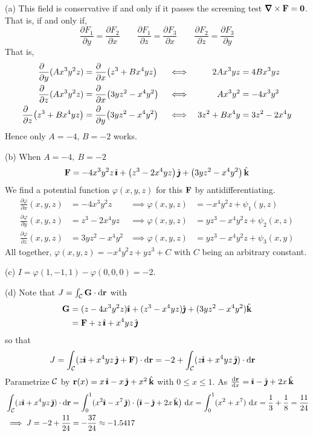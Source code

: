 \begin{solution}  (a)
This field is conservative if and only if it passes the screening test 
$\vnabla\times\vF=\vZero$. That is, if and only if,
$$
\frac{\partial F_1}{\partial y}=\frac{\partial F_2}{\partial x}\qquad
\frac{\partial F_1}{\partial z}=\frac{\partial F_3}{\partial x}\qquad
\frac{\partial F_2}{\partial z}=\frac{\partial F_3}{\partial y}
$$
That is,
\begin{align*}
\frac{\partial\hfill}{\partial y}(Ax^3y^2z)
&=\frac{\partial\hfill}{\partial x}\big(z^3+Bx^4yz\big) &
&\iff &
2Ax^3yz & =4Bx^3yz
\\
%
\frac{\partial\hfill}{\partial z}(Ax^3y^2z)
&=\frac{\partial\hfill}{\partial x}\big(3yz^2-x^4y^2\big) &
&\iff &
Ax^3y^2 & =-4x^3y^2
\\
%
\frac{\partial\hfill}{\partial z}\big(z^3+Bx^4yz\big)
&=\frac{\partial\hfill}{\partial y}\big(3yz^2-x^4y^2\big) &
&\iff &
3z^2+Bx^4y& =3z^2-2x^4y
\end{align*}
Hence only $A=-4$, $B=-2$ works.

(b) When $A=-4,\ B=-2$
$$
\mathbf{F}=-4x^3y^2z\,\hat{\pmb{\imath}}+\big(z^3-2x^4yz\big)\,\hat{\pmb{\jmath}}
+\big(3yz^2-x^4y^2\big)\,\hat{\mathbf{k}}
$$
We find a potential function $\varphi(x,y,z)$  for this $\mathbf{F}$ by antidifferentiating.
\begin{align*}
\frac{\partial \varphi}{\partial x}(x,y,z) &= -4x^3y^2z &\implies 
\varphi(x,y,z)&= -x^4y^2z+\psi_1(y,z)\\
\frac{\partial \varphi}{\partial y}(x,y,z) &= z^3-2x^4yz &\implies \varphi(x,y,z)&=yz^3-x^4y^2z+\psi_2(x,z)\\
\frac{\partial \varphi}{\partial z}(x,y,z) &= 3yz^2-x^4y^2&\implies \varphi(x,y,z)&=yz^3-x^4y^2z+\psi_3(x,y)
\end{align*}
All together, $\varphi(x,y,z)=-x^4y^2z+yz^3+C$
with $C$ being an arbitrary constant.

(c) $I=\varphi(1,-1,1)-\varphi(0,0,0)=-2$.

(d) 
Note that $J=\int_{\mathcal{C}}\mathbf{G}\cdot\mathrm{d}\mathbf{r}$ with
\begin{align*}
\mathbf{G} &= (z-4x^3y^2z)\hat{\pmb{\imath}}+(z^3-x^4yz)\hat{\pmb{\jmath}}+(3yz^2-x^4y^2)\hat{\mathbf{k}} \\
    &=\mathbf{F} +z\,\hat{\pmb{\imath}}+x^4yz\,\hat{\pmb{\jmath}}
\end{align*}
so that
\begin{align*}
J%
&=\int_\cC(z\hi+x^4yz\,\hj+\vF)\cdot \dee{\vr}
=-2+\int_\cC(z\hi+x^4yz\,\hj)\cdot \dee{\vr}
\end{align*}
Parametrize $\mathcal{C}$ by $\mathbf{r}(x)=x\,\hat{\pmb{\imath}}-x\,\hat{\pmb{\jmath}}+x^2\,\hat{\mathbf{k}}$ with $0\le x\le 1$. As
$\diff{\vr}{x}=\hi-\hj+2x\,\hk$
\begin{align*}
&\int_{\mathcal{C}}(z\hat{\pmb{\imath}}+x^4yz\,\hat{\pmb{\jmath}})\cdot \mathrm{d}\mathbf{r}
=\int_0^1(x^2\hat{\pmb{\imath}}-x^7\,\hat{\pmb{\jmath}})\cdot \big(\hat{\pmb{\imath}}-\hat{\pmb{\jmath}}+2x\,\hat{\mathbf{k}}\big)\ \mathrm{d}x
=\int_0^1(x^2+x^7)\ \mathrm{d}x
=\frac{1}{3}+\frac{1}{8}
=\frac{11}{24} \\
&\implies J=-2+\frac{11}{24}=-\frac{37}{24}\approx-1.5417
\end{align*}


\end{solution}

